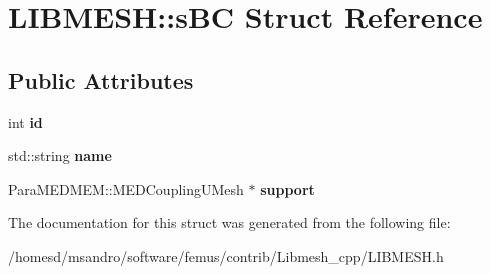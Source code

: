 \hypertarget{struct_l_i_b_m_e_s_h_1_1s_b_c}{\section{L\-I\-B\-M\-E\-S\-H\-:\-:s\-B\-C Struct Reference}
\label{struct_l_i_b_m_e_s_h_1_1s_b_c}
}
\subsection*{Public Attributes}
\begin{DoxyCompactItemize}
\item 
\hypertarget{struct_l_i_b_m_e_s_h_1_1s_b_c_a3d5075ed0d26b7d782d37440a914b038}{int {\bfseries id}}\label{struct_l_i_b_m_e_s_h_1_1s_b_c_a3d5075ed0d26b7d782d37440a914b038}

\item 
\hypertarget{struct_l_i_b_m_e_s_h_1_1s_b_c_a73a5a5bb10149dc38dddcc6702181579}{std\-::string {\bfseries name}}\label{struct_l_i_b_m_e_s_h_1_1s_b_c_a73a5a5bb10149dc38dddcc6702181579}

\item 
\hypertarget{struct_l_i_b_m_e_s_h_1_1s_b_c_ad299f44348472939d112cec6968d7e3e}{Para\-M\-E\-D\-M\-E\-M\-::\-M\-E\-D\-Coupling\-U\-Mesh $\ast$ {\bfseries support}}\label{struct_l_i_b_m_e_s_h_1_1s_b_c_ad299f44348472939d112cec6968d7e3e}

\end{DoxyCompactItemize}


The documentation for this struct was generated from the following file\-:\begin{DoxyCompactItemize}
\item 
/homesd/msandro/software/femus/contrib/\-Libmesh\-\_\-cpp/L\-I\-B\-M\-E\-S\-H.\-h\end{DoxyCompactItemize}
